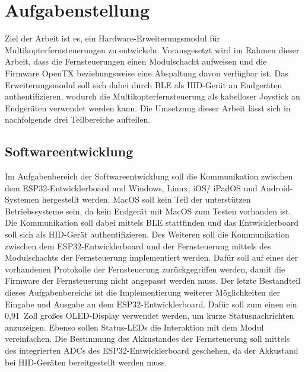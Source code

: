 
\chapter{Aufgabenstellung}
\label{section:Aufgabenstellung}

Ziel der Arbeit ist es, ein Hardware-Erweiterungsmodul für Multikopterfernsteuerungen zu entwickeln. Vorausgesetzt wird im Rahmen dieser Arbeit, dass die Fernsteuerungen einen Modulschacht aufweisen und die Firmware OpenTX \cite{opentxMain} beziehungsweise eine Abspaltung davon verfügbar ist. Das Erweiterungsmodul soll sich dabei durch \acs{BLE} als \acs{HID}-Gerät an Endgeräten authentifizieren, wodurch die Multikopterfernsteuerung als kabelloser Joystick an Endgeräten verwendet werden kann. Die Umsetzung dieser Arbeit lässt sich in nachfolgende drei Teilbereiche aufteilen.

\section{Softwareentwicklung}
\label{section:softwareRequirement}
Im Aufgabenbereich der Softwareentwicklung soll die Kommunikation zwischen dem ESP32-Entwicklerboard und Windows, Linux, iOS/ iPadOS und Android-Systemen hergestellt werden. MacOS soll kein Teil der unterstützen Betriebssysteme sein, da kein Endgerät mit MacOS zum Testen vorhanden ist. Die Kommunikation soll dabei mittels \acs{BLE} stattfinden und das Entwicklerboard soll sich als \acs{HID}-Gerät authentifizieren. Des Weiteren soll die Kommunikation zwischen dem ESP32-Entwicklerboard und der Fernsteuerung mittels des Modulschachts der Fernsteuerung implementiert werden. Dafür soll auf eines der vorhandenen Protokolle der Fernsteuerung zurückgegriffen werden, damit die Firmware der Fernsteuerung nicht angepasst werden muss. Der letzte Bestandteil dieses Aufgabenbereichs ist die Implementierung weiterer Möglichkeiten der Eingabe und Ausgabe an dem ESP32-Entwicklerboard. Dafür soll zum einen ein 0,91~Zoll großes \acs{OLED}-Display verwendet werden, um kurze Statusnachrichten anzuzeigen. Ebenso sollen Status-\acs{LED}s die Interaktion mit dem Modul vereinfachen. Die Bestimmung des Akkustandes der Fernsteuerung soll mittels des integrierten \acp{ADC} des ESP32-Entwicklerboard geschehen, da der Akkustand bei \acs{HID}-Geräten bereitgestellt werden muss.

